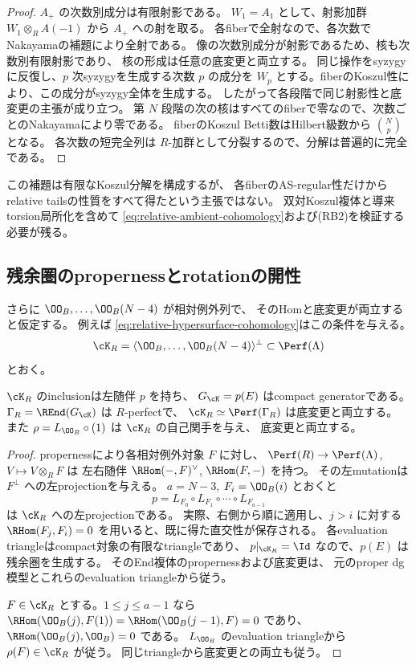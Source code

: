 \begin{proof}
 \(A_+\) の次数別成分は有限射影である。
 \(W_1=A_1\) として、射影加群 \(W_1\otimes_RA(-1)\) から \(A_+\) への射を取る。
 各fiberで全射なので、各次数でNakayamaの補題により全射である。
 像の次数別成分が射影であるため、核も次数別有限射影であり、
 核の形成は任意の底変更と両立する。
 同じ操作をsyzygyに反復し、\(p\) 次syzygyを生成する次数 \(p\) の成分を
 \(W_p\) とする。fiberのKoszul性により、この成分がsyzygy全体を生成する。
 したがって各段階で同じ射影性と底変更の主張が成り立つ。
 第 \(N\) 段階の次の核はすべてのfiberで零なので、次数ごとのNakayamaにより零である。
 fiberのKoszul Betti数はHilbert級数から \(\binom Np\) となる。
 各次数の短完全列は \(R\)-加群として分裂するので、分解は普遍的に完全である。
\end{proof}

この補題は有限なKoszul分解を構成するが、
各fiberのAS-regular性だけからrelative tailsの性質をすべて得たという主張ではない。
双対Koszul複体と導来torsion局所化を含めて
\eqref{eq:relative-ambient-cohomology}および(RB2)を検証する必要が残る。

\subsection{残余圏のpropernessとrotationの開性}

さらに \(\OO_B,\ldots,\OO_B(N-4)\) が相対例外列で、
そのHomと底変更が両立すると仮定する。
例えば \eqref{eq:relative-hypersurface-cohomology}はこの条件を与える。
\[
 \cK_R=\langle\OO_B,\ldots,\OO_B(N-4)\rangle^\perp
 \subset\Perf(\Lambda)
\]
とおく。

\begin{proposition}\label{prop:relative-residual-proper}
 \(\cK_R\) のinclusionは左随伴 \(p\) を持ち、
 \(G_{\cK}=p(E)\) はcompact generatorである。
 \(\Gamma_R=\REnd(G_{\cK})\) は \(R\)-perfectで、
 \(\cK_R\simeq\Perf(\Gamma_R)\) は底変更と両立する。
 また \(\rho=L_{\OO_B}\circ(1)\) は \(\cK_R\) の自己関手を与え、
 底変更と両立する。
\end{proposition}

\begin{proof}
 propernessにより各相対例外対象 \(F\) に対し、
 \(\Perf(R)\to\Perf(\Lambda)\), \(V\mapsto V\otimes_RF\) は
 左右随伴 \(\RHom(-,F)^\vee\), \(\RHom(F,-)\) を持つ。
 その左mutationは \(F^\perp\) への左projectionを与える。
 \(a=N-3\), \(F_i=\OO_B(i)\) とおくと
 \[
 p=L_{F_0}\circ L_{F_1}\circ\cdots\circ L_{F_{a-1}}
 \]
 は \(\cK_R\) への左projectionである。
 実際、右側から順に適用し、\(j>i\) に対する
 \(\RHom(F_j,F_i)=0\) を用いると、既に得た直交性が保存される。
 各evaluation triangleはcompact対象の有限なtriangleであり、
 \(p|_{\cK_R}=\Id\) なので、\(p(E)\) は残余圏を生成する。
 そのEnd複体のpropernessおよび底変更は、
 元のproper dg模型とこれらのevaluation triangleから従う。

 \(F\in\cK_R\) とする。\(1\le j\le a-1\) なら
 \(\RHom(\OO_B(j),F(1))=\RHom(\OO_B(j-1),F)=0\) であり、
 \(\RHom(\OO_B(j),\OO_B)=0\) である。
 \(L_{\OO_B}\) のevaluation triangleから \(\rho(F)\in\cK_R\) が従う。
 同じtriangleから底変更との両立も従う。
\end{proof}

